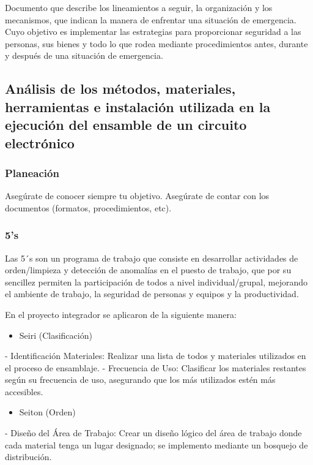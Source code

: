     Documento que describe los lineamientos a seguir, la organización y los mecanismos, que indican la manera de enfrentar una situación de emergencia. Cuyo objetivo es implementar las estrategias para proporcionar seguridad a las personas, sus bienes y todo lo que rodea mediante procedimientos antes, durante y después de una situación de emergencia.
    
    \subsection{Análisis de los métodos, materiales, herramientas e instalación utilizada en la ejecución del ensamble de un circuito electrónico}
    
    \subsubsection{Planeación}
    
    Asegúrate de conocer siempre tu objetivo.
    Asegúrate de contar con los documentos (formatos, procedimientos, etc).
    \subsubsection{5's}
    
    Las 5´s son un programa de trabajo que consiste en desarrollar actividades de orden/limpieza y detección de anomalías en el puesto de trabajo, que por su sencillez permiten la participación de todos a nivel individual/grupal, mejorando el ambiente de trabajo, la seguridad de personas y equipos y la productividad.
    
    En el proyecto integrador se aplicaron de la siguiente manera:
    
    \begin{itemize}
        \item Seiri (Clasificación)
    \end{itemize}
    
    - Identificación Materiales: Realizar una lista de todos y materiales utilizados en el proceso de ensamblaje.
    \newline
    - Frecuencia de Uso: Clasificar los materiales restantes según su frecuencia de uso, asegurando que los más utilizados estén más accesibles.
    
    \begin{itemize}
        \item Seiton (Orden)
    \end{itemize}
    - Diseño del Área de Trabajo: Crear un diseño lógico del área de trabajo donde cada material tenga un lugar designado; se implemento mediante un bosquejo de distribución.
    
